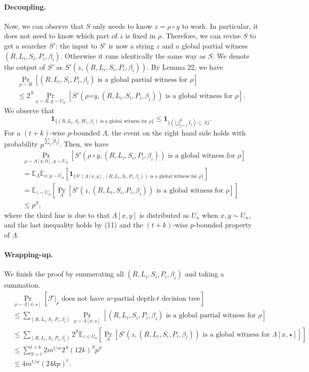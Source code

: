 \documentclass[10pt,a4paper]{article}
\begin{document}
\paragraph{Decoupling.} Now, we can observe that $S$ only needs to know $z=\rho\circ y$ to work. In particular, it does not need to know which part of $z$ is fixed in $\rho$. Therefore, we can revise $S$ to get a searcher $S'$: the input to $S'$ is now a string $z$ and a global partial witness $(R,L_i,S_i,P_i,\beta_i)$. Otherwise it runs identically the same way as $S$. We denote the output of $S'$ as $S'(z,(R,L_i,S_i,P_i,\beta_i))$. By Lemma 22, we have
\begin{multline*}\Pr_{\rho\sim R}[(R,L_i,S_i,P_i,\beta_i)\text{ is a global partial witness for }\rho]\\\le2^S\Pr_{\rho\sim R,y\sim U_n}[S'(\rho\circ y,(R,L_i,S_i,P_i,\beta_i))\text{ is a global witness for }\rho].\end{multline*}
We observe that
\[\mathbf1_{\{(R,L_i,S_i,W_i,\beta_i)\text{ is a global witness for }\rho\}}\le\mathbf1_{\{(\bigcup_{j=1}^RI_j)\subseteq\Lambda\}}.\tag{11}\]
For a $(t+k)$-wise $p$-bounded $\Lambda$, the event on the right hand side holds with probability $p^{\sum_j|I_j|}$. Then, we have
\begin{align*}&\Pr_{\rho\sim\Lambda[x,0],y\sim U_n}[S'(\rho\circ y,(R,L_i,S_i,P_i,\beta_i))\text{ is a global witness for }\rho]\\&=\mathbb E_\Lambda\mathbb E_{x,y\sim U_n}[\mathbf1_{\{S'(\Lambda[x,y],(R,L_i,S_i,P_i,\beta_i))\text{ is a global witness for }\rho\}}]\\&=\mathbb E_{z\sim U_n}\left[\Pr_\Lambda[S'(z,(R,L_i,S_i,P_i,\beta_i))\text{ is a global witness for }\rho]\right]\\&\le p^S,\end{align*}
where the third line is due to that $\Lambda[x,y]$ is distributed as $U_n$ when $x,y\sim U_n$, and the last inequality holds by (11) and the $(t+k)$-wise $p$-bounded property of $\Lambda$.
\paragraph{Wrapping-up.} We finish the proof by enumerating all $(R,L_i,S_i,P_i,\beta_i)$ and taking a summation.
\begin{align*}&\Pr_{\rho\sim\Lambda[x,\star]}[\mathcal F|_\rho\text{ does not have }w\text{-partial depth-}t\text{ decision tree}]\\&\le\sum_{(R,L_i,S_i,P_i,\beta_i)}\Pr_{\rho\sim\Lambda[x,\star]}[(R,L_i,S_i,P_i,\beta_i)\text{ is a global partial witness for }\rho]\\&\le\sum_{(R,L_i,S_i,P_i,\beta_i)}2^S\mathbb E_{z\in U_n}\left[\Pr_\Lambda[S'(z,(R,L_i,S_i,P_i,\beta_i))\text{ is a global witness for }\Lambda[x,\star]]\right]\\&\le\sum_{S=t}^{t+k}2m^{t/w}2^S(12k)^Sp^S\\&\le4m^{t/w}(24kp)^t.\tag{12}\end{align*}
\end{document}

